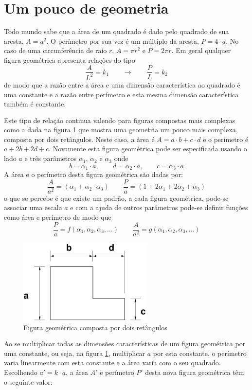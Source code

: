\documentclass[article,12pt,oneside,a4paper,english,brazil,sumario=tradicional]{abntex2}
\newcommand{\lra}{\ensuremath{\longrightarrow}}
\newcommand{\qqrq}{\ensuremath{\qquad\lra\qquad}}
\begin{document}
\section{Um pouco de geometria}
Todo mundo sabe que a área de um quadrado é dado pelo quadrado de sua aresta, $A=a^2$. O perímetro por sua vez é um múltiplo da aresta, $P = 4\cdot a$. No caso de uma circunferência de raio $r$, $A = \pi r^2$ e $P = 2\pi r$. Em geral qualquer figura geométrica apresenta relações do tipo 
\[
\frac{A}{L^2} = k_1 \qqrq \frac{P}{L} = k_2
\]
de modo que a razão entre a área e uma dimensão característica ao quadrado é uma constante e a razão entre perímetro e esta mesma dimensão característica também é constante. 

Este tipo de relação continua valendo para figuras compostas mais complexas como a dada na figura \ref{fig:L2d} que mostra uma geometria um pouco mais complexa, composta por dois retângulos. Neste caso, a área é $A = a\cdot b + c\cdot d$ e o perímetro é $a + 2b + 2d + c$. Novamente esta figura geométrica pode ser especificada usando o lado $a$ e três parâmetros $\alpha_1$, $\alpha_2$ e $\alpha_3$ onde
\[
b = \alpha_1\cdot a, \qquad d = \alpha_2\cdot a, \qquad c = \alpha_3\cdot a
\]
A área e o perímetro desta figura geométrica são dadas por:
\[
\frac{A}{a^2} = (\alpha_1 + \alpha_2\cdot\alpha_3) \qquad \frac{P}{a} = (1 + 2\alpha_1+2\alpha_2+\alpha_3)
\]
o que se percebe é que existe um padrão, a cada figura geométrica, pode-se associar uma escala $a$ e com a ajuda de outros parâmetros pode-se definir funções como área e perímetro de modo que 
\[
\frac{P}{a} = f(\alpha_1, \alpha_2, \alpha_3, \ldots) \qquad \frac{A}{a^2} = g(\alpha_1, \alpha_2, \alpha_3, \ldots)
\]

\begin{figure}
\centering
\includegraphics[width=0.6\textwidth]{./figuras/L2d.pdf}
\caption{Figura geométrica composta por dois retângulos}
\label{fig:L2d}
\end{figure}

Ao se multiplicar todas as dimensões características de um figura geométrica por uma constante, ou seja, na figura \ref{fig:L2d}, multiplicar $a$ por esta constante, o perímetro varia linearmente com esta constante e a área varia com o seu quadrado. Escolhendo $a'=k\cdot a$, a área $A'$ e perímetro $P'$ desta nova figura geométrica têm o seguinte valor:
\end{document}
